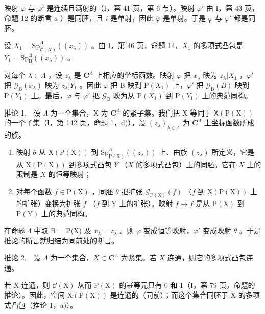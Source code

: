 映射 \(\varphi\) 与 \(\varphi'\) 是连续且满射的（I，第 41 页，第 6 节）。映射 \(\varphi'\) 由 I，第 43 页，命题 12 的断言 \(a\) ）是同胚，且 \(i\) 是单射，因此 \(\varphi\) 是单射。于是 \(\varphi\) 与 \(\varphi'\) 都是同胚。

设 \(X_{1} = \mathrm{Sp}_{\mathcal{C}(X)}^{\Lambda}((x_{\lambda}))\) 。由 I，第 46 页，命题 14，\(X_{1}\) 的多项式凸包是 \(Y_{1} = \mathrm{Sp}_{\mathrm{B}}^{\Lambda}((x_{\lambda}))\) 。

对每个 \(\lambda\in\Lambda\) ，设 \(z_{\lambda}\) 是 \(\mathbf{C}^{\Lambda}\) 上相应的坐标函数。映射 \(\varphi\) 把 \(x_{\lambda}\) 映为 \(z_{\lambda}|X_{1}\) ，\(\varphi'\) 把 \(\mathcal{G}_{\mathrm{B}}(x_{\lambda})\) 映为 \(z_{\lambda}|Y_{1}\) 。因此 \(\varphi\) 把 B 映到 \(\mathrm{P}(X_{1})\) 上，\(\varphi'\) 把 \(\mathcal{G}_{\mathrm{B}}(B)\) 映到 \(\mathrm{P}(Y_{1})\) 上。最后，\(\varphi\) 与 \(\varphi'\) 把 \(\mathcal{G}_{\mathrm{B}}\) 映为从 \(\mathrm{P}(X_{1})\) 到 \(\mathrm{P}(Y_{1})\) 上的典范同构。

推论 1.　设 \(\Lambda\) 为一个集合，X 为 \(\mathbf{C}^{\Lambda}\) 的紧子集。我们把 X 等同于 \(\mathsf{X}(\mathrm{P}(\mathrm{X}))\) 的一个子集（I，第 142 页，命题 1，d)）。设 \((z_{\lambda})_{\lambda \in \Lambda}\) 为 \(\mathbf{C}^{\Lambda}\) 上坐标函数所成的族。

\begin{enumerate}
\def\labelenumi{\alph{enumi})}
\item
  映射 \(\theta\) 从 \(\mathrm{X}(\mathrm{P}(\mathrm{X}))\) 到 \(\mathrm{Sp}_{\mathrm{P}(\mathrm{X})}^{\Lambda}((z_{\lambda}))\) 上、由族 \((z_{\lambda})\) 所定义，它是从 \(\mathrm{X}(\mathrm{P}(\mathrm{X}))\) 到多项式凸包 \(Y\) （\(X\) 的多项式凸包）上的同胚。它在 \(X\) 上的限制是 \(X\) 的恒等映射；
\item
  对每个函数 \(f \in \mathrm{P}(\mathrm{X})\) ，同胚 \(\theta\) 把扩张 \(\mathcal{G}_{\mathrm{P}(\mathrm{X})}(f)\) （\(f\) 到 \(\mathrm{X}(\mathrm{P}(\mathrm{X}))\) 上的扩张）变换为扩张 \(\widetilde{f}\) （\(f\) 到 \(\mathrm{Y}\) 上的扩张）。映射 \(f \mapsto \widetilde{f}\) 是从 \(\mathrm{P}(\mathrm{X})\) 到 \(\mathrm{P}(\mathrm{Y})\) 上的典范同构。
\end{enumerate}

在命题 4 中取 B = P(X) 及 \(x_{\lambda} = z_{\lambda}\) 。则 \(\varphi\) 变成恒等映射，\(\varphi'\) 变成映射 \(\theta\) 。于是推论的断言就归结为同前处的断言。

推论 2.　设 \(\Lambda\) 为一个集合，\(X \subset \mathbf{C}^{\Lambda}\) 为紧集。若 \(X\) 连通，则它的多项式凸包连通。

若 X 连通，则 \(\mathcal{C}(\mathrm{X})\) 从而 \(\mathrm{P}(\mathrm{X})\) 的幂等元只有 0 和 1（I，第 79 页，命题的推论）。因此，空间 \(\mathrm{X}(\mathrm{P}(\mathrm{X}))\) 是连通的（同前）；而这个集合同胚于 X 的多项式凸包（推论 1，a)）。

